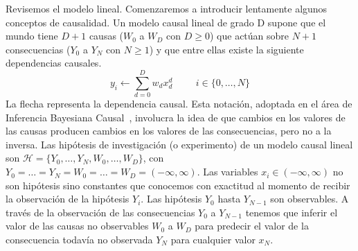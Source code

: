 \documentclass[a4paper,11pt]{book}
\theoremstyle{definition}
\begin{document}
Revisemos el modelo lineal.
%
Comenzaremos a introducir lentamente algunos conceptos de causalidad.
%
Un modelo causal lineal de grado D supone que el mundo tiene $D+1$ causas ($W_0$ a $W_D$ con $D\geq 0$) que act\'uan sobre $N+1$ consecuencias ($Y_0$ a $Y_{N}$ con $N\geq1$) y que entre ellas existe la siguiente dependencias causales.
%
\begin{equation*} \label{eq:modelo_lineal}
y_i \leftarrow \sum_{d = 0}^{D} w_d x_d^d \hspace{1cm} \text{$i \in \{0, \dots,N\}$}
\end{equation*}
%
La flecha representa la dependencia causal.
%
Esta notaci\'on, adoptada en el \'area de Inferencia Bayesiana Causal~\cite{pearl2009-causality}, involucra la idea de que cambios en los valores de las causas producen cambios en los valores de las consecuencias, pero no a la inversa.
%
Las hip\'otesis de investigaci\'on (o experimento) de un modelo causal lineal son $\mathcal{H}=\{Y_0, \dots , Y_N, W_0, \dots, W_D\}$, con $Y_0=\dots=Y_N=W_0=\dots = W_D = (-\infty, \infty)$.
%
Las variables $x_i \in (-\infty, \infty)$ no son hip\'otesis sino constantes que conocemos con exactitud al momento de recibir la observaci\'on de la hip\'otesis $Y_i$.
%
Las hip\'otesis $Y_0$ hasta $Y_{N-1}$ son observables.
%
A trav\'es de la observaci\'on de las consecuencias $Y_0$ a $Y_{N-1}$ tenemos que inferir el valor de las causas no observables $W_0$ a $W_D$ para predecir el valor de la consecuencia todav\'ia no observada $Y_{N}$ para cualquier valor $x_{N}$.

\end{document}
